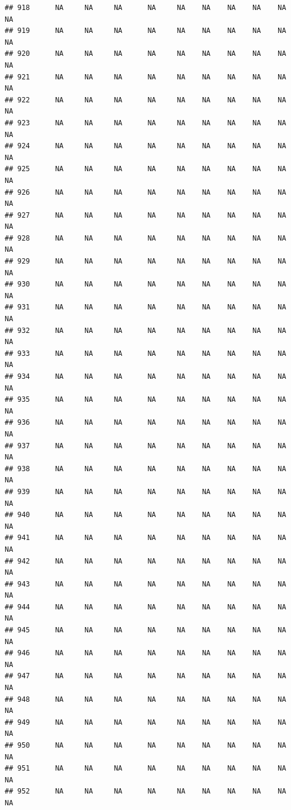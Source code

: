 \documentclass{article}\usepackage{graphicx, color}
\makeatletter
\newenvironment{kframe}{%
 \def\at@end@of@kframe{}%
 \ifinner\ifhmode%
  \def\at@end@of@kframe{\end{minipage}}%
  \begin{minipage}{\columnwidth}%
 \fi\fi%
 \def\FrameCommand##1{\hskip\@totalleftmargin \hskip-\fboxsep
 \colorbox{shadecolor}{##1}\hskip-\fboxsep
     \hskip-\linewidth \hskip-\@totalleftmargin \hskip\columnwidth}%
 \MakeFramed {\advance\hsize-\width
   \@totalleftmargin\z@ \linewidth\hsize
   \@setminipage}}%
 {\par\unskip\endMakeFramed%
 \at@end@of@kframe}
\newenvironment{knitrout}{}{} %
\makeatother
\begin{document}
\begin{knitrout}
\begin{kframe}
\begin{verbatim}
## 918      NA     NA     NA      NA     NA    NA    NA    NA    NA     NA
## 919      NA     NA     NA      NA     NA    NA    NA    NA    NA     NA
## 920      NA     NA     NA      NA     NA    NA    NA    NA    NA     NA
## 921      NA     NA     NA      NA     NA    NA    NA    NA    NA     NA
## 922      NA     NA     NA      NA     NA    NA    NA    NA    NA     NA
## 923      NA     NA     NA      NA     NA    NA    NA    NA    NA     NA
## 924      NA     NA     NA      NA     NA    NA    NA    NA    NA     NA
## 925      NA     NA     NA      NA     NA    NA    NA    NA    NA     NA
## 926      NA     NA     NA      NA     NA    NA    NA    NA    NA     NA
## 927      NA     NA     NA      NA     NA    NA    NA    NA    NA     NA
## 928      NA     NA     NA      NA     NA    NA    NA    NA    NA     NA
## 929      NA     NA     NA      NA     NA    NA    NA    NA    NA     NA
## 930      NA     NA     NA      NA     NA    NA    NA    NA    NA     NA
## 931      NA     NA     NA      NA     NA    NA    NA    NA    NA     NA
## 932      NA     NA     NA      NA     NA    NA    NA    NA    NA     NA
## 933      NA     NA     NA      NA     NA    NA    NA    NA    NA     NA
## 934      NA     NA     NA      NA     NA    NA    NA    NA    NA     NA
## 935      NA     NA     NA      NA     NA    NA    NA    NA    NA     NA
## 936      NA     NA     NA      NA     NA    NA    NA    NA    NA     NA
## 937      NA     NA     NA      NA     NA    NA    NA    NA    NA     NA
## 938      NA     NA     NA      NA     NA    NA    NA    NA    NA     NA
## 939      NA     NA     NA      NA     NA    NA    NA    NA    NA     NA
## 940      NA     NA     NA      NA     NA    NA    NA    NA    NA     NA
## 941      NA     NA     NA      NA     NA    NA    NA    NA    NA     NA
## 942      NA     NA     NA      NA     NA    NA    NA    NA    NA     NA
## 943      NA     NA     NA      NA     NA    NA    NA    NA    NA     NA
## 944      NA     NA     NA      NA     NA    NA    NA    NA    NA     NA
## 945      NA     NA     NA      NA     NA    NA    NA    NA    NA     NA
## 946      NA     NA     NA      NA     NA    NA    NA    NA    NA     NA
## 947      NA     NA     NA      NA     NA    NA    NA    NA    NA     NA
## 948      NA     NA     NA      NA     NA    NA    NA    NA    NA     NA
## 949      NA     NA     NA      NA     NA    NA    NA    NA    NA     NA
## 950      NA     NA     NA      NA     NA    NA    NA    NA    NA     NA
## 951      NA     NA     NA      NA     NA    NA    NA    NA    NA     NA
## 952      NA     NA     NA      NA     NA    NA    NA    NA    NA     NA

\end{verbatim}
\end{kframe}
\end{knitrout}
\end{document}
